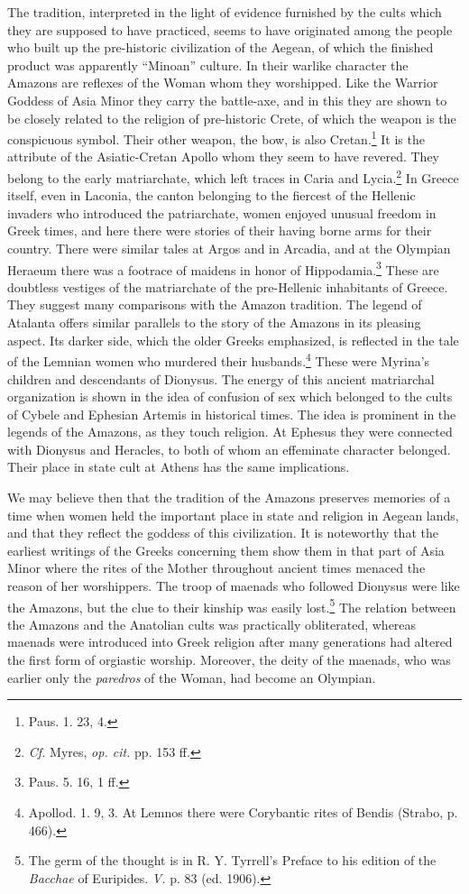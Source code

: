 \documentclass[a4paper, 12pt, oneside]{article}
\begin{document}
The tradition, interpreted in the light of evidence furnished by the cults which they are supposed to have practiced, seems to have originated among the people who built up the pre-historic civilization of the Aegean, of which the finished product was apparently ``Minoan'' culture. In their warlike character the Amazons are reflexes of the Woman whom they worshipped. Like the Warrior Goddess of Asia Minor they carry the battle-axe, and in this they are shown to be closely related to the religion of pre-historic Crete, of which the weapon is the conspicuous symbol. Their other weapon, the bow, is also Cretan.\footnote{Paus. 1. 23, 4.} It is the attribute of the Asiatic-Cretan Apollo whom they seem to have revered. They belong to the early matriarchate, which left traces in Caria and Lycia.\footnote{\emph{Cf.} Myres, \emph{op. cit.} pp. 153 ff.} In Greece itself, even in Laconia, the canton belonging to the fiercest of the Hellenic invaders who introduced the patriarchate, women enjoyed unusual freedom in Greek times, and here there were stories of their having borne arms for their country. There were similar tales at Argos and in Arcadia, and at the Olympian Heraeum there was a footrace of maidens in honor of Hippodamia.\footnote{Paus. 5. 16, 1 ff.} These are doubtless vestiges of the matriarchate of the pre-Hellenic inhabitants of Greece. They suggest many comparisons with the Amazon tradition. The legend of Atalanta offers similar parallels to the story of the Amazons in its pleasing aspect. Its darker side, which the older Greeks emphasized, is reflected in the tale of the Lemnian women who murdered their husbands.\footnote{Apollod. 1. 9, 3. At Lemnos there were Corybantic rites of Bendis (Strabo, p. 466).} These were Myrina's children and descendants of Dionysus. The energy of this ancient matriarchal organization is shown in the idea of confusion of sex which belonged to the cults of Cybele and Ephesian Artemis in historical times. The idea is prominent in the legends of the Amazons, as they touch religion. At Ephesus they were connected with Dionysus and Heracles, to both of whom an effeminate character belonged. Their place in state cult at Athens has the same implications.

We may believe then that the tradition of the Amazons preserves memories of a time when women held the important place in state and religion in Aegean lands, and that they reflect the goddess of this civilization. It is noteworthy that the earliest writings of the Greeks concerning them show them in that part of Asia Minor where the rites of the Mother throughout ancient times menaced the reason of her worshippers. The troop of maenads who followed Dionysus were like the Amazons, but the clue to their kinship was easily lost.\footnote{The germ of the thought is in R. Y. Tyrrell's Preface to his edition of the \emph{Bacchae} of Euripides. \emph{V.} p. 83 (ed. 1906).} The relation between the Amazons and the Anatolian cults was practically obliterated, whereas maenads were introduced into Greek religion after many generations had altered the first form of orgiastic worship. Moreover, the deity of the maenads, who was earlier only the \emph{paredros} of the Woman, had become an Olympian.
\end{document}
